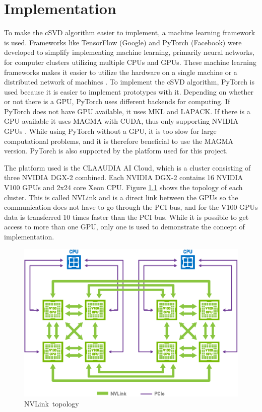 \chapter{Implementation}

To make the cSVD algorithm easier to implement, a machine learning framework is used. Frameworks like TensorFlow (Google) \cite{tensorflow:about} and PyTorch (Facebook) \cite{pytorch:docs} were developed to simplify implementing machine learning, primarily neural networks, for computer clusters utilizing multiple CPUs and GPUs. These machine learning frameworks makes it easier to utilize the hardware on a single machine or a distributed network of machines \cite{pytorch:docs}. To implement the cSVD algorithm, PyTorch is used because it is easier to implement prototypes with it.  Depending on whether or not there is a GPU, PyTorch uses different backends for computing. If PyTorch does not have GPU available, it uses MKL and LAPACK. If there is a GPU available it uses MAGMA with CUDA, thus only supporting NVIDIA GPUs \cite{pytorch:docs}. While using PyTorch without a GPU, it is too slow for large computational problems, and it is therefore beneficial to use the MAGMA version. PyTorch is also supported by the platform used for this project.

The platform used is the CLAAUDIA AI Cloud, which is a cluster consisting of three NVIDIA DGX-2 combined. Each NVIDIA DGX-2 contains 16 NVIDIA V100 GPUs and 2x24 core Xeon CPU. Figure \ref{fig:nvlink} shows the topology of each cluster. This is called NVLink and is a direct link between the GPUs so the communication does not have to go through the PCI bus, and for the V100 GPUs data is transferred 10 times faster than the PCI bus. While it is possible to get access to more than one GPU, only one is used to demonstrate the concept of implementation.

\begin{figure}[H]
  \centering
  \includegraphics[scale=0.7]{Figures/nvlink.eps}
  \caption[]{NVLink\protect\footnotemark\ topology}
  \label{fig:nvlink}
\end{figure}
  
